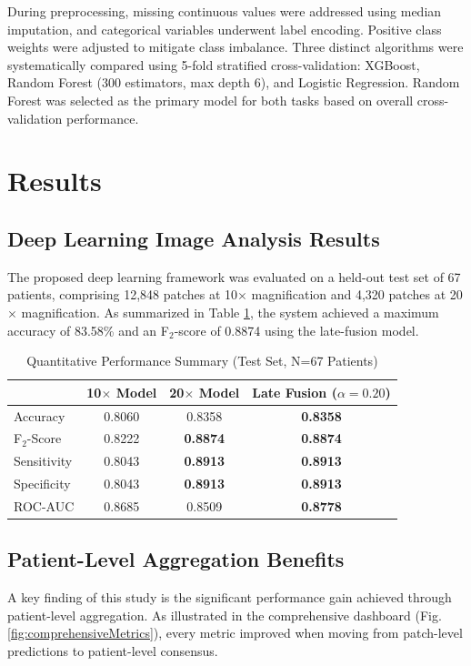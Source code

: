 \documentclass[conference]{IEEEtran}
\begin{document}
During preprocessing, missing continuous values were addressed using median imputation, and categorical variables underwent label encoding. Positive class weights were adjusted to mitigate class imbalance. Three distinct algorithms were systematically compared using 5-fold stratified cross-validation: XGBoost, Random Forest (300 estimators, max depth 6), and Logistic Regression. Random Forest was selected as the primary model for both tasks based on overall cross-validation performance.

\section{Results}

\subsection{Deep Learning Image Analysis Results}
The proposed deep learning framework was evaluated on a held-out test set of 67 patients, comprising 12,848 patches at 10$\times$ magnification and 4,320 patches at 20$\times$ magnification. As summarized in Table \ref{tab:results}, the system achieved a maximum accuracy of 83.58\% and an F$_2$-score of 0.8874 using the late-fusion model.

\begin{table}[htbp]
\caption{Quantitative Performance Summary (Test Set, N=67 Patients)}
\label{tab:results}
\centering
\renewcommand{\arraystretch}{1.1}
\setlength{\tabcolsep}{4pt} 
\begin{tabular}{l c c c}
\toprule
 & \textbf{10$\times$ Model} & \textbf{20$\times$ Model} & \textbf{Late Fusion ($\alpha=0.20$)} \\
\midrule
Accuracy & 0.8060 & 0.8358 & \textbf{0.8358} \\
F$_2$-Score & 0.8222 & \textbf{0.8874} & \textbf{0.8874} \\
Sensitivity & 0.8043 & \textbf{0.8913} & \textbf{0.8913} \\
Specificity & 0.8043 & \textbf{0.8913} & \textbf{0.8913} \\
ROC-AUC & 0.8685 & 0.8509 & \textbf{0.8778} \\
\bottomrule
\end{tabular}
\end{table}
\subsection{Patient-Level Aggregation Benefits}
A key finding of this study is the significant performance gain achieved through patient-level aggregation. As illustrated in the comprehensive dashboard (Fig. \ref{fig:comprehensiveMetrics}), every metric improved when moving from patch-level predictions to patient-level consensus.
\end{document}
